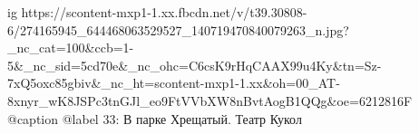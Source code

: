  
 
 
 
 

\ifcmt
  ig https://scontent-mxp1-1.xx.fbcdn.net/v/t39.30808-6/274165945_644468063529527_140719470840079263_n.jpg?_nc_cat=100&ccb=1-5&_nc_sid=5cd70e&_nc_ohc=C6csK9rHqCAAX99u4Ky&tn=Sz-7xQ5oxc85gbiv&_nc_ht=scontent-mxp1-1.xx&oh=00_AT-8xnyr_wK8JSPc3tnGJl_eo9FtVVbXW8nBvtAogB1QQg&oe=6212816F
  @caption @label 33: В парке Хрещатый. Театр Кукол
\fi

